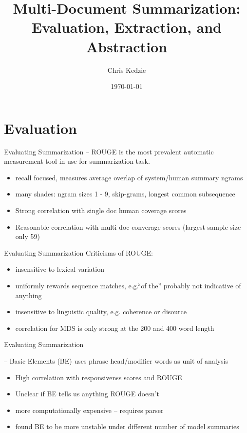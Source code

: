 \documentclass{beamer}
\title{Multi-Document Summarization: Evaluation, Extraction, and Abstraction}
\date{\today}
\author{Chris Kedzie}
\institute{Dept. of Computer Science, Columbia University}
\begin{document}
  \maketitle
  \section{Evaluation}


\begin{frame}{Evaluating Summarization}
\cite{lin2004rouge} -- ROUGE is the most prevalent automatic measurement tool
 in use for summarization task.
\begin{itemize}
\item recall focused, measures average overlap of system/human summary ngrams
\item many shades: ngram sizes 1 - 9, skip-grams, longest common subsequence 
\item Strong correlation with single doc human coverage scores
\item Reasonable correlation with multi-doc converage scores 
    (largest sample size only 59)
\end{itemize}
\end{frame}

\begin{frame}{Evaluating Summarization}
Criticisms of ROUGE:
\begin{itemize}
\item insensitive to lexical variation
\item uniformly rewards sequence matches, e.g.``of the'' probably not indicative of anything
\item insensitive to linguistic quality, e.g. coherence or disource
\item correlation for MDS is only strong at the 200 and 400 word length
\end{itemize}
\end{frame}

\begin{frame}{Evaluating Summarization}

\cite{hovy2006automated} -- Basic Elements (BE) uses phrase head/modifier words
 as unit of analysis

\begin{itemize}
\item High correlation with responsivenss scores and ROUGE
\item Unclear if BE tells us anything ROUGE doesn't
\item more computationally expensive -- requires parser
\item \cite{owczarzak2009evaluation} found BE to be more unstable under different number of model summaries
\end{itemize}
\end{frame}
\end{document}
